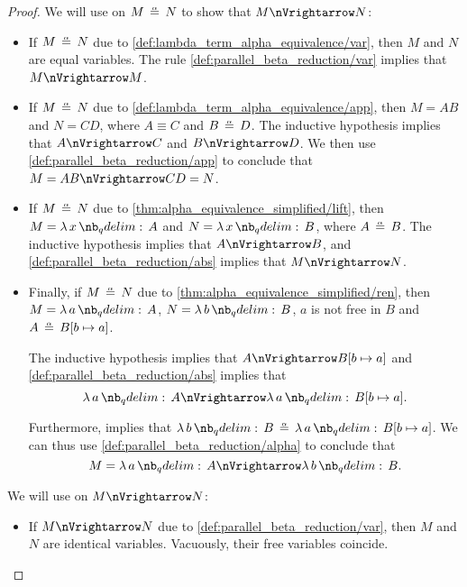 \begin{proof}
   We will use  on \( M \aequiv N \) to show that \( M \pred N \):
  \begin{itemize}
    \item If \( M \aequiv N \) due to \ref{def:lambda_term_alpha_equivalence/var}, then \( M \) and \( N \) are equal variables. The rule \ref{def:parallel_beta_reduction/var} implies that \( M \pred M \).

    \item If \( M \aequiv N \) due to \ref{def:lambda_term_alpha_equivalence/app}, then \( M = AB \) and \( N = CD \), where \( A \equiv C \) and \( B \aequiv D \). The inductive hypothesis implies that \( A \pred C \) and \( B \pred D \). We then use \ref{def:parallel_beta_reduction/app} to conclude that \( M = AB \pred CD = N \).

    \item If \( M \aequiv N \) due to \ref{thm:alpha_equivalence_simplified/lift}, then \( M = \qabs x A \) and \( N = \qabs x B \), where \( A \aequiv B \). The inductive hypothesis implies that \( A \pred B \), and \ref{def:parallel_beta_reduction/abs} implies that \( M \pred N \).

    \item Finally, if \( M \aequiv N \) due to \ref{thm:alpha_equivalence_simplified/ren}, then \( M = \qabs a A \), \( N = \qabs b B \), \( a \) is not free in \( B \) and \( A \aequiv B[b \mapsto a] \).

    The inductive hypothesis implies that \( A \pred B[b \mapsto a] \) and \ref{def:parallel_beta_reduction/abs} implies that
    \begin{equation*}
      \qabs a A \pred \qabs a B[b \mapsto a].
    \end{equation*}

    Furthermore,  implies that \( \qabs b B \aequiv \qabs a B[b \mapsto a] \). We can thus use \ref{def:parallel_beta_reduction/alpha} to conclude that
    \begin{equation*}
      M = \qabs a A \pred \qabs b B.
    \end{equation*}
  \end{itemize}

   We will use  on \( M \pred N \):
  \begin{itemize}
    \item If \( M \pred N \) due to \ref{def:parallel_beta_reduction/var}, then \( M \) and \( N \) are identical variables. Vacuously, their free variables coincide.


\end{itemize}
\end{proof}
